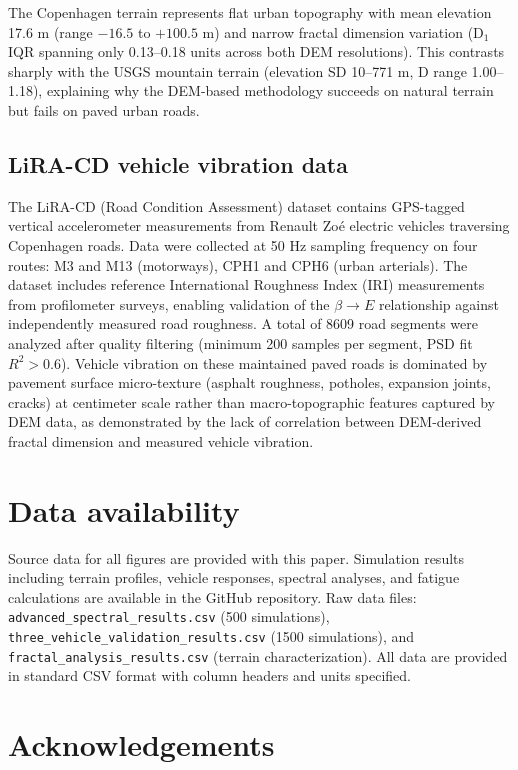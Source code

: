 \documentclass[11pt]{article}
\begin{document}
The Copenhagen terrain represents flat urban topography with mean elevation 17.6 m (range $-16.5$ to $+100.5$ m) and narrow fractal dimension variation (D$_1$ IQR spanning only 0.13--0.18 units across both DEM resolutions). This contrasts sharply with the USGS mountain terrain (elevation SD 10--771 m, D range 1.00--1.18), explaining why the DEM-based methodology succeeds on natural terrain but fails on paved urban roads.

\subsection*{LiRA-CD vehicle vibration data}

The LiRA-CD (Road Condition Assessment) dataset\cite{Skar2023} contains GPS-tagged vertical accelerometer measurements from Renault Zoé electric vehicles traversing Copenhagen roads. Data were collected at 50 Hz sampling frequency on four routes: M3 and M13 (motorways), CPH1 and CPH6 (urban arterials). The dataset includes reference International Roughness Index (IRI) measurements from profilometer surveys, enabling validation of the $\beta \rightarrow E$ relationship against independently measured road roughness. A total of 8609 road segments were analyzed after quality filtering (minimum 200 samples per segment, PSD fit $R^2 > 0.6$). Vehicle vibration on these maintained paved roads is dominated by pavement surface micro-texture (asphalt roughness, potholes, expansion joints, cracks) at centimeter scale rather than macro-topographic features captured by DEM data, as demonstrated by the lack of correlation between DEM-derived fractal dimension and measured vehicle vibration.


\section*{Data availability}

Source data for all figures are provided with this paper. Simulation results including terrain profiles, vehicle responses, spectral analyses, and fatigue calculations are available in the GitHub repository. Raw data files: \texttt{advanced\_spectral\_results.csv} (500 simulations), \texttt{three\_vehicle\_validation\_results.csv} (1500 simulations), and \texttt{fractal\_analysis\_results.csv} (terrain characterization). All data are provided in standard CSV format with column headers and units specified.


\section*{Acknowledgements}
\end{document}
